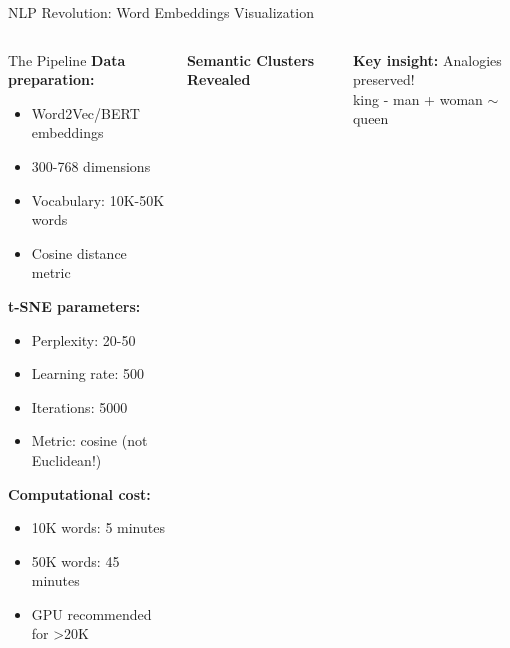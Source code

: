 \documentclass[aspectratio=169]{beamer}
\begin{document}
\begin{frame}{NLP Revolution: Word Embeddings Visualization}
\begin{columns}
\begin{block}{The Pipeline}
\textbf{Data preparation:}
\begin{itemize}
\item Word2Vec/BERT embeddings
\item 300-768 dimensions
\item Vocabulary: 10K-50K words
\item Cosine distance metric
\end{itemize}

\textbf{t-SNE parameters:}
\begin{itemize}
\item Perplexity: 20-50
\item Learning rate: 500
\item Iterations: 5000
\item Metric: cosine (not Euclidean!)
\end{itemize}

\textbf{Computational cost:}
\begin{itemize}
\item 10K words: 5 minutes
\item 50K words: 45 minutes
\item GPU recommended for >20K
\end{itemize}
\end{block}

\begin{center}
\textbf{Semantic Clusters Revealed}\\[3mm]
\end{center}

\textbf{Key insight:} Analogies preserved!\\
king - man + woman $\sim$ queen
\end{columns}
\end{frame}
\end{document}
